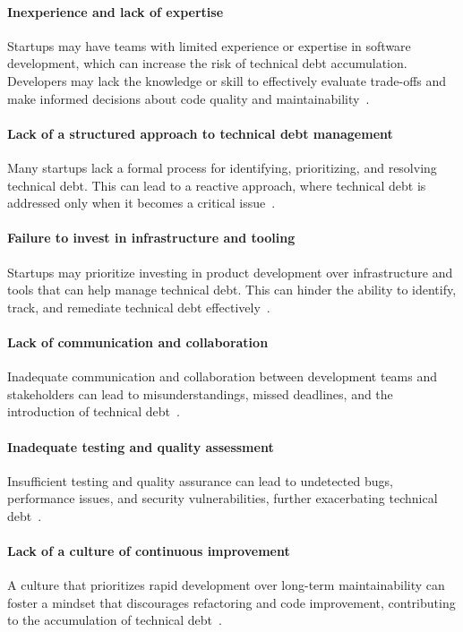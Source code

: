 \paragraph{Inexperience and lack of expertise} 
Startups may have teams with limited experience or expertise in software development, which can increase the risk of technical debt accumulation.
Developers may lack the knowledge or skill to effectively evaluate trade-offs and make informed decisions about code quality and maintainability~\cite{Blog21:online}. 

\paragraph{Lack of a structured approach to technical debt management} 
Many startups lack a formal process for identifying, prioritizing, and resolving technical debt.
This can lead to a reactive approach, where technical debt is addressed only when it becomes a critical issue~\cite{FowlerBottlenecks}.

\paragraph{Failure to invest in infrastructure and tooling} 
Startups may prioritize investing in product development over infrastructure and tools that can help manage technical debt.
This can hinder the ability to identify, track, and remediate technical debt effectively~\cite{Blog21:online,Totalqua26:online}.

\paragraph{Lack of communication and collaboration}
Inadequate communication and collaboration between development teams and stakeholders can lead to misunderstandings, missed deadlines, and the introduction of technical debt~\cite{Whopayso60:online,TheTop5S17:online}.

\paragraph{Inadequate testing and quality assessment}
Insufficient testing and quality assurance can lead to undetected bugs, performance issues, and security vulnerabilities, further exacerbating technical debt~\cite{HowtoGet43:online}.

\paragraph{Lack of a culture of continuous improvement}
A culture that prioritizes rapid development over long-term maintainability can foster a mindset that discourages refactoring and code improvement, contributing to the accumulation of technical debt~\cite{FowlerBottlenecks,Whopayso60:online}.



